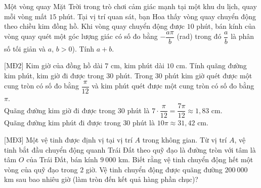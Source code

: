\begin{bt}%
	Một vòng quay Mặt Trời trong trò chơi cảm giác mạnh tại một khu du lịch, quay mỗi vòng mất $15$ phút. Tại vị trí quan sát, bạn Hoa thấy vòng quay chuyển động theo chiều kim đồng hồ. Khi vòng quay chuyển động được $10$ phút, bán kính của vòng quay quét một góc lượng giác có số đo bằng $-\dfrac{a\pi}{b}$ (rad) trong đó $\dfrac{a}{b}$ là phân số tối giản và $a$, $b > 0$). Tính $a + b$.
\end{bt}

\begin{bt}%
[MĐ2]
	Kim giờ của đồng hồ dài $7$ cm, kim phút dài $10$ cm. Tính quãng đường kim phút, kim giờ đi được trong $30$ phút.
	\loigiai
	{
		Trong $30$ phút kim giờ quét được một cung tròn có số đo bằng $\dfrac{\pi}{12}$ và kim phút quét được một cung tròn có số đo bằng $\pi$.\\
		Quãng đường kim giờ đi được trong $30$ phút là $7\cdot \dfrac{\pi}{12} = \dfrac{7\pi}{12} \approx 1{,}83$ cm.\\
		Quãng đường kim phút đi được trong $30$ phút là $10 \pi \approx 31{,}42$ cm.
	}
\end{bt}

\begin{bt}%
[MĐ3]
	Một vệ tinh được định vị tại vị trí $A$ trong không gian. Từ vị trí $A$, vệ tinh bắt đầu chuyển động quanh Trái Đất theo quỹ đạo là đường tròn với tâm là tâm $O$ của Trái Đất, bán kính $9~000$ km. Biết rằng vệ tinh chuyển động hết một vòng của quỹ đạo trong $2$ giờ. Vệ tinh chuyển động được quãng đường $200~000$ km sau bao nhiêu giờ (làm tròn đến kết quả hàng phần chục)?
\end{bt}

